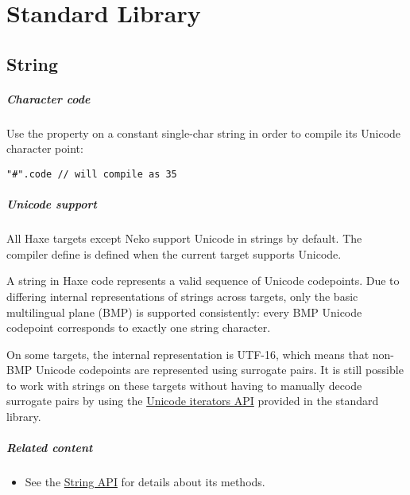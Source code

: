 \chapter{Standard Library}
\label{std}

\section{String}
\label{std-String}


\paragraph{Character code}
Use the  property on a constant single-char string in order to compile its Unicode character point:

\begin{lstlisting}
"#".code // will compile as 35
\end{lstlisting}


\paragraph{Unicode support}
All Haxe targets except Neko support Unicode in strings by default. The compiler define  is defined when the current target supports Unicode.

A string in Haxe code represents a valid sequence of Unicode codepoints. Due to differing internal representations of strings across targets, only the basic multilingual plane (BMP) is supported consistently: every BMP Unicode codepoint corresponds to exactly one string character.

On some targets, the internal representation is UTF-16, which means that non-BMP Unicode codepoints are represented using surrogate pairs. It is still possible to work with strings on these targets without having to manually decode surrogate pairs by using the \href{https://api.haxe.org/v/development/haxe/iterators/StringIteratorUnicode.html}{Unicode iterators API} provided in the standard library.

\paragraph{Related content}
\begin{itemize}
	\item See the \href{https://api.haxe.org/String.html}{String API} for details about its methods.
\end{itemize} 

